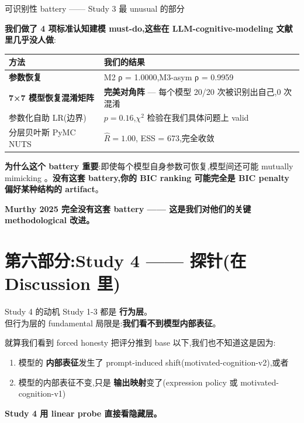 \documentclass[aspectratio=169,11pt]{ctexbeamer}
\newcommand{\hi}[1]{\textcolor{ow-red}{\textbf{#1}}}
\newcommand{\hib}[1]{\textcolor{ow-blue}{\textbf{#1}}}
\begin{document}
\begin{frame}{可识别性 battery —— Study 3 最 unusual 的部分}

\textbf{我们做了 4 项标准认知建模 must-do,这些在 LLM-cognitive-modeling 文献里几乎没人做}:

\bigskip
\begin{tabular}{p{4cm}p{8cm}}
\toprule
方法 & 我们的结果 \\
\midrule
\hib{参数恢复} & M2 ρ = 1.0000,M3-asym ρ = 0.9959 \\
\hib{7×7 模型恢复混淆矩阵} & \hi{完美对角阵} — 每个模型 20/20 次被识别出自己,0 次混淆 \\
参数化自助 LR(边界) & $p = 0.16$,$\chi^2$ 检验在我们具体问题上 valid \\
分层贝叶斯 PyMC NUTS & $\hat R = 1.00$, ESS = 673,完全收敛 \\
\bottomrule
\end{tabular}

\bigskip
\textbf{为什么这个 battery 重要}:即使每个模型自身参数可恢复,模型间还可能 mutually mimicking 。\hi{没有这套 battery,你的 BIC ranking 可能完全是 BIC penalty 偏好某种结构的 artifact}。

\bigskip
\hi{Murthy 2025 完全没有这套 battery —— 这是我们对他们的关键 methodological 改进。}
\end{frame}

\section{第六部分:Study 4 —— 探针(在 Discussion 里)}

\begin{frame}{Study 4 的动机}
Study 1-3 都是 \hib{行为层}。\\
但行为层的 fundamental 局限是:\hi{我们看不到模型内部表征}。

\bigskip
就算我们看到 forced honesty 把评分推到 base 以下,我们也不知道这是因为:
\begin{enumerate}
\item 模型的 \hib{内部表征}发生了 prompt-induced shift(motivated-cognition-v2),或者
\item 模型的内部表征不变,只是 \hib{输出映射}变了(expression policy 或 motivated-cognition-v1)
\end{enumerate}

\bigskip
\hi{Study 4 用 linear probe 直接看隐藏层。}
\end{frame}
\end{document}
